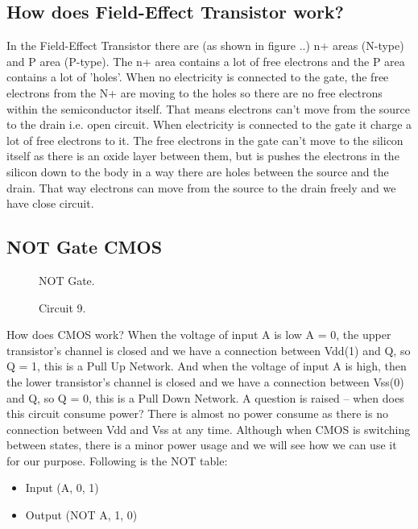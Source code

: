 \subsection{ How does Field-Effect Transistor work? }
In the Field-Effect Transistor there are (as shown in figure ..) n+ areas (N-type) and P area (P-type). The n+ area contains a lot of free electrons and the P area contains a lot of 'holes'. When no electricity is connected to the gate, the free electrons from the N+ are moving to the holes so there are no free electrons within the semiconductor itself. That means electrons can't move from the source to the drain i.e. open circuit. When electricity is connected to the gate it charge a lot of free electrons to it. The free electrons in the gate can't move to the silicon itself as there is an oxide layer between them, but is pushes the electrons in the silicon down to the body in a way there are holes between the source and the drain. That way electrons can move from the source to the drain freely and we have close circuit. 
\subsection{ NOT Gate CMOS}
\begin{figure}
    \centering
    
    \caption{NOT Gate.} \label{fig:not}
\end{figure}
\begin{figure}
    \centering
    
    \caption{Circuit 9.} \label{fig:circuit9}
\end{figure}
How does CMOS work? When the voltage of input A is low A = 0, the upper transistor's channel is closed and we have a connection between Vdd(1) and Q, so Q = 1, this is a Pull Up Network. And when the voltage of input A is high, then the lower transistor's channel is closed and we have a connection between Vss(0) and Q, so Q = 0, this is a Pull Down Network.
A question is raised – when does this circuit consume power? There is almost no power consume as there is no connection between Vdd and Vss at any time. Although when CMOS is switching between states, there is a minor power usage and we will see how we can use it for our purpose.
Following is the NOT table:
\begin{itemize}
\item Input (A, 0, 1)
    	\item Output (NOT A, 1, 0)
\end{itemize}

